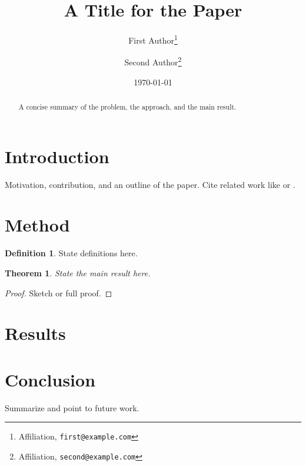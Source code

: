 \documentclass[11pt]{article}
\title{A Title for the Paper}
\author{%
  First Author\thanks{Affiliation, \texttt{first@example.com}}
  \and
  Second Author\thanks{Affiliation, \texttt{second@example.com}}
}
\date{\today}
\theoremstyle{plain}
\newtheorem{theorem}{Theorem}
\theoremstyle{definition}
\newtheorem{definition}{Definition}
\begin{document}
\maketitle

\begin{abstract}
A concise summary of the problem, the approach, and the main result.
\end{abstract}

\section{Introduction}
\label{sec:intro}

Motivation, contribution, and an outline of the paper. Cite related work
like \citet{example2020} or \citep{example2020}.

\section{Method}
\label{sec:method}

\begin{definition}
State definitions here.
\end{definition}

\begin{theorem}
State the main result here.
\end{theorem}

\begin{proof}
Sketch or full proof.
\end{proof}

\section{Results}
\label{sec:results}


\section{Conclusion}
\label{sec:conclusion}

Summarize and point to future work.



\end{document}
